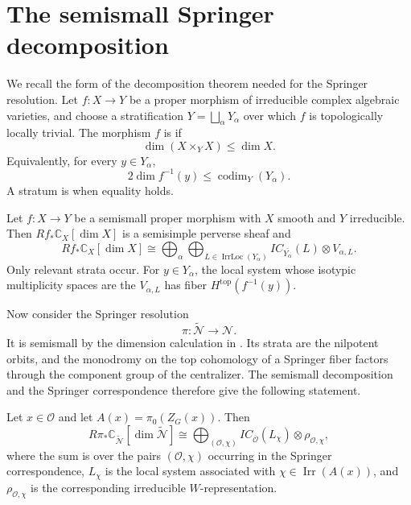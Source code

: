 \section{The semismall Springer decomposition}
\label{chapter_bbdg}

We recall the form of the decomposition theorem needed for the Springer
resolution. Let $f:X\to Y$ be a proper morphism of irreducible complex
algebraic varieties, and choose a stratification
$Y=\bigsqcup_\alpha Y_\alpha$ over which $f$ is topologically locally
trivial. The morphism $f$ is  if
\[
  \dim(X\times_YX)\leq\dim X.
\]
Equivalently, for every $y\in Y_\alpha$,
\[
  2\dim f^{-1}(y)\leq\operatorname{codim}_Y(Y_\alpha).
\]
A stratum is  when equality holds.

\begin{theorem}{\cite{Beilinson-Bernstein-Deligne1982}}
  Let $f:X\to Y$ be a semismall proper morphism with $X$ smooth and
  $Y$ irreducible. Then $Rf_*\mathbb{C}_X[\dim X]$ is a semisimple
  perverse sheaf and
  \[
    Rf_*\mathbb{C}_X[\dim X]
    \cong
    \bigoplus_{\alpha}
    \bigoplus_{L\in\operatorname{IrrLoc}(Y_\alpha)}
    IC_{\overline{Y_\alpha}}(L)\otimes V_{\alpha,L}.
  \]
  Only relevant strata occur. For $y\in Y_\alpha$, the local system
  whose isotypic multiplicity spaces are the $V_{\alpha,L}$ has fiber
  $H^{\mathrm{top}}(f^{-1}(y))$.
\end{theorem}

Now consider the Springer resolution
\[
  \pi:\widetilde{\mathcal N}\longrightarrow\mathcal N.
\]
It is semismall by the dimension calculation in
. Its strata are the nilpotent orbits, and
the monodromy on the top cohomology of a Springer fiber factors through
the component group of the centralizer. The semismall decomposition and
the Springer correspondence therefore give the following statement.

\begin{theorem}{\cite{Springer1978,BM83}}
  Let $x\in\mathcal O$ and let
  \(A(x)=\pi_0(Z_G(x))\). Then
  \[
    R\pi_*\mathbb{C}_{\widetilde{\mathcal N}}
      [\dim\widetilde{\mathcal N}]
    \cong
    \bigoplus_{(\mathcal O,\chi)}
    IC_{\overline{\mathcal O}}(L_\chi)
      \otimes\rho_{\mathcal O,\chi},
  \]
  where the sum is over the pairs $(\mathcal O,\chi)$ occurring in the
  Springer correspondence, $L_\chi$ is the local system associated
  with $\chi\in\operatorname{Irr}(A(x))$, and
  $\rho_{\mathcal O,\chi}$ is the corresponding irreducible
  $W$-representation.
\end{theorem}


